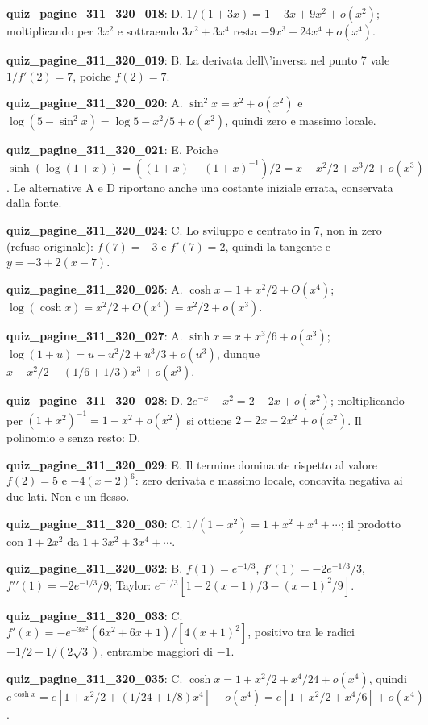 \documentclass[11pt,a4paper]{article}
\newcounter{quiz}
\begin{document}
\noindent\textbf{quiz\_pagine\_311\_320\_018}: D. $1/(1+3x)=1-3x+9x^2+o(x^2)$; moltiplicando per $3x^2$ e sottraendo $3x^2+3x^4$ resta $-9x^3+24x^4+o(x^4)$.\par\medskip
\noindent\textbf{quiz\_pagine\_311\_320\_019}: B. La derivata dell\textbackslash{}'inversa nel punto 7 vale $1/f\prime(2)=7$, poiche $f(2)=7$.\par\medskip
\noindent\textbf{quiz\_pagine\_311\_320\_020}: A. $\sin^2x=x^2+o(x^2)$ e $\log(5-\sin^2x)=\log5-x^2/5+o(x^2)$, quindi zero e massimo locale.\par\medskip
\noindent\textbf{quiz\_pagine\_311\_320\_021}: E. Poiche $\sinh(\log(1+x))=((1+x)-(1+x)^{-1})/2=x-x^2/2+x^3/2+o(x^3)$. Le alternative A e D riportano anche una costante iniziale errata, conservata dalla fonte.\par\medskip
\noindent\textbf{quiz\_pagine\_311\_320\_024}: C. Lo sviluppo e centrato in 7, non in zero (refuso originale): $f(7)=-3$ e $f\prime(7)=2$, quindi la tangente e $y=-3+2(x-7)$.\par\medskip
\noindent\textbf{quiz\_pagine\_311\_320\_025}: A. $\cosh x=1+x^2/2+O(x^4)$; $\log(\cosh x)=x^2/2+O(x^4)=x^2/2+o(x^3)$.\par\medskip
\noindent\textbf{quiz\_pagine\_311\_320\_027}: A. $\sinh x=x+x^3/6+o(x^3)$; $\log(1+u)=u-u^2/2+u^3/3+o(u^3)$, dunque $x-x^2/2+(1/6+1/3)x^3+o(x^3)$.\par\medskip
\noindent\textbf{quiz\_pagine\_311\_320\_028}: D. $2e^{-x}-x^2=2-2x+o(x^2)$; moltiplicando per $(1+x^2)^{-1}=1-x^2+o(x^2)$ si ottiene $2-2x-2x^2+o(x^2)$. Il polinomio e senza resto: D.\par\medskip
\noindent\textbf{quiz\_pagine\_311\_320\_029}: E. Il termine dominante rispetto al valore $f(2)=5$ e $-4(x-2)^6$: zero derivata e massimo locale, concavita negativa ai due lati. Non e un flesso.\par\medskip
\noindent\textbf{quiz\_pagine\_311\_320\_030}: C. $1/(1-x^2)=1+x^2+x^4+\cdots$; il prodotto con $1+2x^2$ da $1+3x^2+3x^4+\cdots$.\par\medskip
\noindent\textbf{quiz\_pagine\_311\_320\_032}: B. $f(1)=e^{-1/3}$, $f\prime(1)=-2e^{-1/3}/3$, $f\prime\prime(1)=-2e^{-1/3}/9$; Taylor: $e^{-1/3}[1-2(x-1)/3-(x-1)^2/9]$.\par\medskip
\noindent\textbf{quiz\_pagine\_311\_320\_033}: C. $f\prime(x)=-e^{-3x^2}(6x^2+6x+1)/[4(x+1)^2]$, positivo tra le radici $-1/2\pm1/(2\sqrt3)$, entrambe maggiori di $-1$.\par\medskip
\noindent\textbf{quiz\_pagine\_311\_320\_035}: C. $\cosh x=1+x^2/2+x^4/24+o(x^4)$, quindi $e^{\cosh x}=e[1+x^2/2+(1/24+1/8)x^4]+o(x^4)=e[1+x^2/2+x^4/6]+o(x^4)$.\par\medskip
\end{document}
